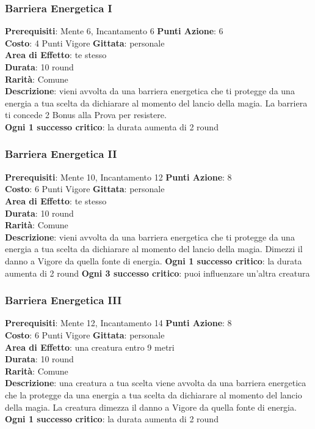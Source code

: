 \documentclass[12pt,a4paper,twoside,openany]{book}
\begin{document}
\begin{multicols}{2}
\subsubsection*{Barriera Energetica I}
\textbf{Prerequisiti}: Mente 6, Incantamento 6
\textbf{Punti Azione}: 6\\
\textbf{Costo}: 4 Punti Vigore
\textbf{Gittata}: personale\\
\textbf{Area di Effetto}: te stesso\\
\textbf{Durata}: 10 round\\
\textbf{Rarità}: Comune\\
\textbf{Descrizione}: vieni avvolta da una barriera energetica che ti protegge da una energia a tua scelta da dichiarare al momento del lancio della magia. La barriera ti concede 2 Bonus alla Prova per resistere.\\
\textbf{Ogni 1 successo critico}: la durata aumenta di 2 round

\subsubsection*{Barriera Energetica II}
\textbf{Prerequisiti}: Mente 10, Incantamento 12
\textbf{Punti Azione}: 8\\
\textbf{Costo}: 6 Punti Vigore
\textbf{Gittata}: personale\\
\textbf{Area di Effetto}: te stesso\\
\textbf{Durata}: 10 round\\
\textbf{Rarità}: Comune\\
\textbf{Descrizione}: vieni avvolta da una barriera energetica che ti protegge da una energia a tua scelta da dichiarare al momento del lancio della magia. Dimezzi il danno a Vigore da quella fonte di energia.
\textbf{Ogni 1 successo critico}: la durata aumenta di 2 round
\textbf{Ogni 3 successo critico}: puoi influenzare un'altra creatura

\subsubsection*{Barriera Energetica III}
\textbf{Prerequisiti}: Mente 12, Incantamento 14
\textbf{Punti Azione}: 8\\
\textbf{Costo}: 6 Punti Vigore
\textbf{Gittata}: personale\\
\textbf{Area di Effetto}: una creatura entro 9 metri\\
\textbf{Durata}: 10 round\\
\textbf{Rarità}: Comune\\
\textbf{Descrizione}: una creatura a tua scelta viene avvolta da una barriera energetica che la protegge da una energia a tua scelta da dichiarare al momento del lancio della magia. La creatura dimezza il danno a Vigore da quella fonte di energia.
\textbf{Ogni 1 successo critico}: la durata aumenta di 2 round



\end{multicols}
\end{document}
